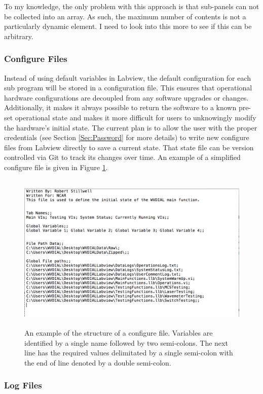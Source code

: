 To my knowledge, the only problem with this approach is that sub-panels can not be collected into an array. As such, the maximum number of contents is not a particularly dynamic element. I need to look into this more to see if this can be arbitrary. 

\subsubsection{Configure Files}
Instead of using default variables in Labview, the default configuration for each sub program will be stored in a configuration file. This ensures that operational hardware configurations are decoupled from any software upgrades or changes. Additionally, it makes it always possible to return the software to a known pre-set operational state and makes it more difficult for users to unknowingly modify the hardware's initial state. The current plan is to allow the user with the proper credentials (see Section \ref{Sec:Password} for more details) to write new configure files from Labview directly to save a current state. That state file can be version controlled via Git to track its changes over time. An example of a simplified configure file is given in Figure \ref{Fig:ConfigureFile}. 

\begin{figure}[!h]\centering
\includegraphics[height=3in]{Figures/ConfigureFileExample.pdf}
\caption{An example of the structure of a configure file. Variables are identified by a single name followed by two semi-colons. The next line has the required values delimitated by a single semi-colon with the end of line denoted by a double semi-colon.}\label{Fig:ConfigureFile}
\end{figure}

\subsubsection{Log Files}

